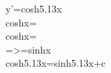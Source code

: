y'=cosh5.13x\\
\because coshx=\\
\hspace*{0.2cm}\int coshx=\int {}\\
=>=sinhx\\
\therefore\int cosh5.13x=sinh5.13x+c